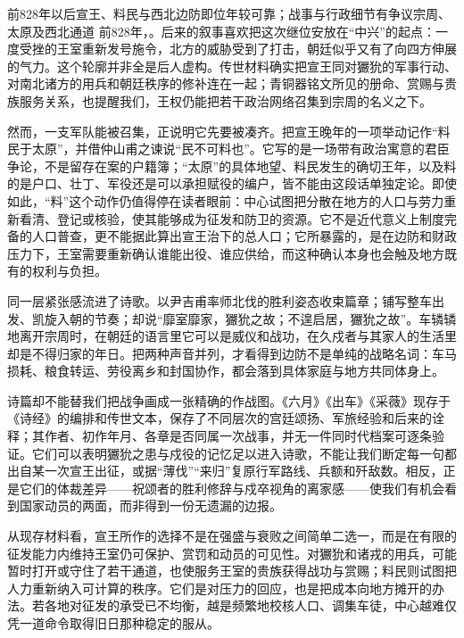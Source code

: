 \begin{event}{前828年以后}{宣王、料民与西北边防}{即位年较可靠；战事与行政细节有争议}{宗周、太原及西北通道}
前828年，。后来的叙事喜欢把这次继位安放在“中兴”的起点：一度受挫的王室重新发号施令，北方的威胁受到了打击，朝廷似乎又有了向四方伸展的气力。这个轮廓并非全是后人虚构。传世材料确实把宣王同对玁狁的军事行动、对南北诸方的用兵和朝廷秩序的修补连在一起；青铜器铭文所见的册命、赏赐与贵族服务关系，也提醒我们，王权仍能把若干政治网络召集到宗周的名义之下。

然而，一支军队能被召集，正说明它先要被凑齐。把宣王晚年的一项举动记作“料民于太原”，并借仲山甫之谏说“民不可料也”。它写的是一场带有政治寓意的君臣争论，不是留存在案的户籍簿；“太原”的具体地望、料民发生的确切王年，以及料的是户口、壮丁、军役还是可以承担赋役的编户，皆不能由这段话单独定论。即使如此，“料”这个动作仍值得停在读者眼前：中心试图把分散在地方的人口与劳力重新看清、登记或核验，使其能够成为征发和防卫的资源。它不是近代意义上制度完备的人口普查，更不能据此算出宣王治下的总人口；它所暴露的，是在边防和财政压力下，王室需要重新确认谁能出役、谁应供给，而这种确认本身也会触及地方既有的权利与负担。

同一层紧张感流进了诗歌。以尹吉甫率师北伐的胜利姿态收束篇章；铺写整车出发、凯旋入朝的节奏；却说“靡室靡家，玁狁之故；不遑启居，玁狁之故”。车辚辚地离开宗周时，在朝廷的语言里它可以是威仪和战功，在久戍者与其家人的生活里却是不得归家的年日。把两种声音并列，才看得到边防不是单纯的战略名词：车马损耗、粮食转运、劳役离乡和封国协作，都会落到具体家庭与地方共同体身上。

诗篇却不能替我们把战争画成一张精确的作战图。《六月》《出车》《采薇》现存于《诗经》的编排和传世文本，保存了不同层次的宫廷颂扬、军旅经验和后来的诠释；其作者、初作年月、各章是否同属一次战事，并无一件同时代档案可逐条验证。它们可以表明玁狁之患与戍役的记忆足以进入诗歌，不能让我们断定每一句都出自某一次宣王出征，或据“薄伐”“来归”复原行军路线、兵额和歼敌数。相反，正是它们的体裁差异——祝颂者的胜利修辞与戍卒视角的离家感——使我们有机会看到国家动员的两面，而非得到一份无遗漏的边报。

从现存材料看，宣王所作的选择不是在强盛与衰败之间简单二选一，而是在有限的征发能力内维持王室仍可保护、赏罚和动员的可见性。对玁狁和诸戎的用兵，可能暂时打开或守住了若干通道，也使服务王室的贵族获得战功与赏赐；料民则试图把人力重新纳入可计算的秩序。它们是对压力的回应，也是把成本向地方摊开的办法。若各地对征发的承受已不均衡，越是频繁地校核人口、调集车徒，中心越难仅凭一道命令取得旧日那种稳定的服从。


\end{event}
